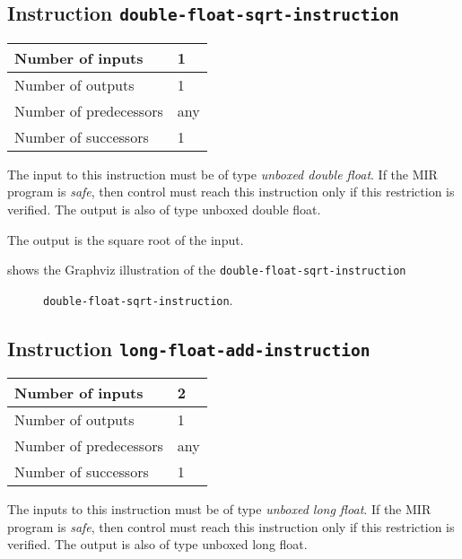 \subsection{Instruction \texttt{double-float-sqrt-instruction}}
\label{mir-instruction-double-float-div}

\begin{tabular}{|l|l|}
\hline
Number of inputs & 1\\
\hline
Number of outputs & 1\\
\hline
Number of predecessors & any\\
\hline
Number of successors & 1\\
\hline
\end{tabular}

The input to this instruction must be of type \emph{unboxed double
  float}.  If the MIR program is \emph{safe}, then control must reach
this instruction only if this restriction is verified.  The output is
also of type unboxed double float.

The output is the square root of the input.

 shows the Graphviz illustration of the
\texttt{double-float-sqrt-instruction}

\begin{figure}
\begin{center}
\end{center}
\caption{\label{fig-double-float-sqrt-instruction}
\texttt{double-float-sqrt-instruction}.}
\end{figure}

\subsection{Instruction \texttt{long-float-add-instruction}}
\label{mir-instruction-long-float-add}

\begin{tabular}{|l|l|}
\hline
Number of inputs & 2\\
\hline
Number of outputs & 1\\
\hline
Number of predecessors & any\\
\hline
Number of successors & 1\\
\hline
\end{tabular}

The inputs to this instruction must be of type \emph{unboxed long
  float}.  If the MIR program is \emph{safe}, then control must reach
this instruction only if this restriction is verified.  The output is
also of type unboxed long float.

